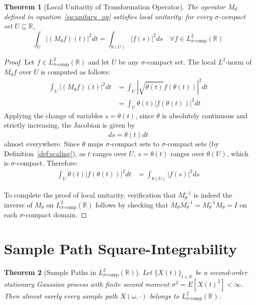 \documentclass{article}
\newtheorem{theorem}{Theorem}[section]
\begin{document}
\begin{theorem}[Local Unitarity of Transformation Operator]\label{thm:local_unitary}
The operator $M_{\theta}$ defined in equation~\eqref{eq:unitary_op} satisfies local unitarity: for every $\sigma$-compact set $U \subseteq \mathbb{R}$,
\begin{equation}
\label{eq:local_L2_preserve}
\int_U |(M_{\theta} f)(t)|^2 dt = \int_{\theta(U)} |f(s)|^2 ds \quad \forall f \in L^2_{\sigma\text{-comp}}(\mathbb{R})
\end{equation}
\end{theorem}

\begin{proof}
Let $f \in L^2_{\sigma\text{-comp}}(\mathbb{R})$ and let $U$ be any $\sigma$-compact set. The local $L^2$-norm of $M_{\theta} f$ over $U$ is computed as follows:
\begin{align}
\int_U |(M_{\theta} f)(t)|^2 dt &= \int_U \left|\sqrt{\dot{\theta}(t)} f(\theta(t))\right|^2 dt \\
&= \int_U \dot{\theta}(t) |f(\theta(t))|^2 dt
\end{align}
Applying the change of variables $s = \theta(t)$, since $\theta$ is absolutely continuous and strictly increasing, the Jacobian is given by
\begin{equation}
ds = \dot{\theta}(t) dt
\end{equation}
almost everywhere. Since $\theta$ maps $\sigma$-compact sets to $\sigma$-compact sets (by Definition~\ref{def:scaling}), as $t$ ranges over $U$, $s = \theta(t)$ ranges over $\theta(U)$, which is $\sigma$-compact. Therefore:
\begin{align}
\int_U \dot{\theta}(t) |f(\theta(t))|^2 dt &= \int_{\theta(U)} |f(s)|^2 ds
\end{align}

To complete the proof of local unitarity, verification that $M_{\theta}^{-1}$ is indeed the inverse of $M_{\theta}$ on $L^2_{\sigma\text{-comp}}(\mathbb{R})$ follows by checking that $M_{\theta} M_{\theta}^{-1} = M_{\theta}^{-1} M_{\theta} = I$ on each $\sigma$-compact domain.
\end{proof}

\section{Sample Path Square-Integrability}

\begin{theorem}[Sample Paths in $L^2_{\sigma\text{-comp}}(\mathbb{R})$]\label{thm:sample_paths_in_L2sigma}
Let $\{X(t)\}_{t \in \mathbb{R}}$ be a second-order stationary Gaussian process with finite second moment $\sigma^2 = E[X(t)^2] < \infty$. Then almost surely every sample path $X(\omega, \cdot)$ belongs to $L^2_{\sigma\text{-comp}}(\mathbb{R})$.
\end{theorem}
\end{document}
